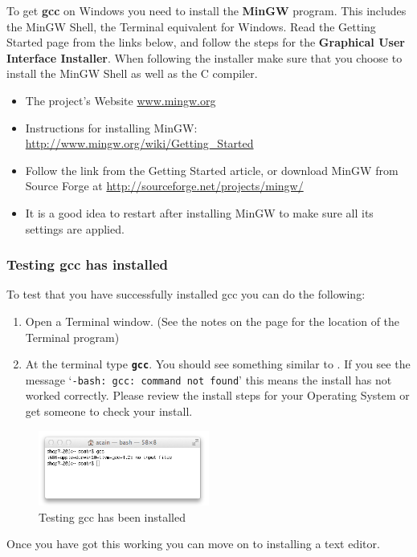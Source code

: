 To get \textbf{gcc} on Windows you need to install the \textbf{MinGW} program. This includes the MinGW Shell, the Terminal equivalent for Windows. Read the Getting Started page from the links below, and follow the steps for the \textbf{Graphical User Interface Installer}. When following the installer make sure that you choose to install the MinGW Shell as well as the C compiler.

\begin{itemize}
  \item The project's Website \url{www.mingw.org}
  \item Instructions for installing MinGW: \url{http://www.mingw.org/wiki/Getting_Started}
  \item Follow the link from the Getting Started article, or download MinGW from Source Forge at \url{http://sourceforge.net/projects/mingw/}
  \item It is a good idea to restart after installing MinGW to make sure all its settings are applied.
\end{itemize}

\clearpage
\subsubsection{Testing gcc has installed} %
\label{ssub:testing_your_install}

To test that you have successfully installed gcc you can do the following:
\begin{enumerate}
  \item Open a Terminal window. (See the notes on the  page for the location of the Terminal program)
  \item At the terminal type \textbf{\texttt{gcc}}. You should see something similar to . If you see the message `\texttt{-bash: gcc: command not found}' this means the install has not worked correctly. Please review the install steps for your Operating System or get someone to check your install.
\end{enumerate}

\begin{figure}[h]
   \centering
   \includegraphics[width=0.5\textwidth]{./topics/programs-and-compilers/images/gccInstall} 
   \caption{Testing gcc has been installed}
   \label{fig:gcc-install}
\end{figure}

Once you have got this working you can move on to installing a text editor.



